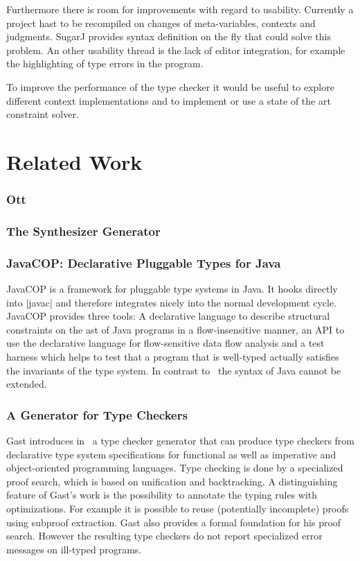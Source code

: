 Furthermore there is room for improvements with regard to
usability. Currently a project hast to be recompiled on changes of
meta-variables, contexts and judgments. SugarJ\cite{erdweg2011sugarj}
provides syntax definition on the fly that could solve this
problem. An other usability thread is the lack of editor integration,
for example the highlighting of type errors in the program.

To improve the performance of the type checker it would be useful to
explore different context implementations and to implement or use a
state of the art constraint solver.
\section{Related Work}
\subsubsection{Ott}
\subsubsection{The Synthesizer Generator}
\subsubsection{JavaCOP: Declarative Pluggable Types for Java}
JavaCOP \cite{Markstrum:2010:JDP:1667048.1667049} is a framework for
pluggable type systems in Java. It hooks directly into \code|javac|
and therefore integrates nicely into the normal development
cycle. JavaCOP provides three tools: A declarative language to
describe structural constraints on the \gls{ast} of Java programs in a
flow-insensitive manner, an API to use the declarative language for
flow-sensitive data flow analysis and a test harness which helps to
test that a program that is well-typed actually satisfies the
invariants of the type system. In contrast to~\cite{bergan2007typmix}
the syntax of Java cannot be extended.


\subsubsection{A Generator for Type Checkers}
Gast introduces in~\cite{gast2005generator} a type checker generator
that can produce type checkers from declarative type system
specifications for functional as well as imperative and
object-oriented programming languages. Type checking is done by a
specialized proof search, which is based on unification and
backtracking. A distinguishing feature of Gast's work is the
possibility to annotate the typing rules with optimizations. For
example it is possible to reuse (potentially incomplete) proofs using
subproof extraction. Gast also provides a formal foundation for his
proof search. However the resulting type checkers do not report
specialized error messages on ill-typed programs.

